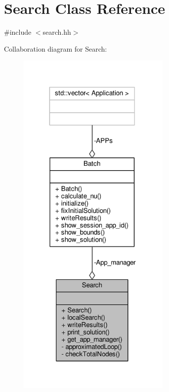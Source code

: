 \hypertarget{classSearch}{\section{Search Class Reference}
\label{classSearch}
}


{\ttfamily \#include $<$search.\-hh$>$}



Collaboration diagram for Search\-:
\nopagebreak
\begin{figure}[H]
\begin{center}
\leavevmode
\includegraphics[width=211pt]{classSearch__coll__graph}
\end{center}
\end{figure}
